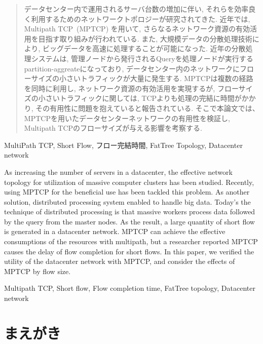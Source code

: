 \documentclass[technicalreport]{ieicej}
\begin{document}
\begin{abstract}
データセンター内で運用されるサーバ台数の増加に伴い, それらを効率良く利用するためのネットワークトポロジーが研究されてきた.
近年では, Multipath TCP~(MPTCP) を用いて, さらなるネットワーク資源の有効活用を目指す取り組みが行われている.
また, 大規模データの分散処理技術により, ビッグデータを高速に処理することが可能になった.
近年の分散処理システムは, 管理ノードから発行されるQueryを処理ノードが実行するpartition-aggreateになっており,
データセンター内のネットワークにフローサイズの小さいトラフィックが大量に発生する.
MPTCPは複数の経路を同時に利用し, ネットワーク資源の有効活用を実現するが,
フローサイズの小さいトラフィックに関しては,
TCPよりも処理の完結に時間がかかり, その有用性に問題を抱えていると報告されている.
そこで本論文では、MPTCPを用いたデータセンターネットワークの有用性を検証し, Multipath
TCPのフローサイズが与える影響を考察する.
\end{abstract}
\begin{keyword}
MultiPath TCP, Short Flow, フロー完結時間, FatTree Topology, Datacenter network
\end{keyword}
\begin{eabstract}
As increasing the number of servers in a datacenter, the effective network
topology for utilization of massive computer clusters has been studied.
Recently, using MPTCP for the beneficial use has been tackled this problem.
As another solution, distributed processing system enabled to handle big data.
Today's the technique of distributed processing is that massive workers process data followed by the query from the master nodes.
As the result, a large quantity of short flow is generated in a datacenter network.
MPTCP can achieve the effective consumptions of the resources with multipath,
but a researcher reported MPTCP causes the delay of flow completion for short flows.
In this paper, we verified the utility of the datacenter network with MPTCP, and consider the effects of MPTCP by flow size.
\end{eabstract}
\begin{ekeyword}
Multipath TCP, Short flow, Flow completion time, FatTree topology, Datacenter
network
\end{ekeyword}
\maketitle

\section{まえがき}
\label{sec:intro}
\end{document}
